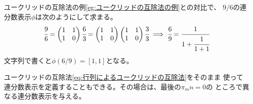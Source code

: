 	\begin{example}[連分数表示の例]\label{eg:連分数表示の例} %
		ユークリッドの互除法の例\ref{eg:ユークリッドの互除法の例}との対比で、
		$9/6$の連分数表示$\phi$は次のようにして求まる。
		\begin{equation*}\begin{split}
			\cfrac{9}{6} = \begin{pmatrix}
				1 & 1 \\
				1 & 0 \\
			\end{pmatrix} \cfrac{6}{3} = \begin{pmatrix}
				1 & 1 \\
				1 & 0 \\
			\end{pmatrix}\begin{pmatrix}
				1 & 1 \\
				1 & 0 \\
			\end{pmatrix} \cfrac{3}{3} \implies \cfrac{6}{9} = \cfrac{1}{1 + \cfrac{1}{1 + 1}}
		\end{split}\end{equation*}
		文字列で書くと$\phi(6/9)=[1,1]$となる。
	\end{example} %

	ユークリッドの互除法\eqref{eq:行列によるユークリッドの互除法}をそのまま
	使って連分数表示を定義することもできる。その場合は、最後の$\pi_mn=0$の
	ところで異なる連分数表示を与える。


